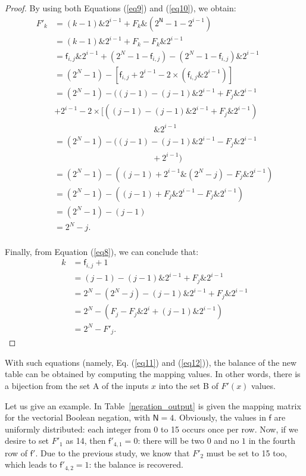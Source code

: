 \documentclass[conference]{IEEEtran}
\begin{document}
\begin{proof}
By using both Equations (\ref{eq9}) and (\ref{eq10}), we obtain:
\begin{equation}
\label{eq11}
\begin{array}{ll}
F'_k&=(k-1)\&2^{i-1}+F_k\&(2^\mathsf{N}-1-2^{i-1})\\
&=(k-1)\&2^{i-1}+F_k-F_k\&2^{i-1}\\
&=\mathsf{f}_{i,j} \& 2^{i-1}+(2^N-1-\mathsf{f}_{i,j})-(2^N-1-\mathsf{f}_{i,j}) \& 2^{i-1}\\
&=(2^N-1)-[\mathsf{f}_{i,j}+2^{i-1}-2 \times (\mathsf{f}_{i,j} \& 2^{i-1})] \\
&=(2^N-1)-((j-1)-(j-1)\&2^{i-1}+F_j\&2^{i-1}\\
&+2^{i-1}-2 \times [((j-1)-(j-1) \& 2^{i-1}+F_j \& 2^{i-1})\\
&~~~~~~~~~~~~~~~~~~~~~~~~~~~~~~~~~~~~~~~~~~~~~~~~~~~~~~\& 2^{i-1}\\
&=(2^N-1)-((j-1)-(j-1)\&2^{i-1}-F_j\&2^{i-1}\\
&~~~~~~~~~~~~~~~~~~~~~~~~~~~~~~~~~~~~~~~~~~~~~~~~~~~~~+2^{i-1})\\
&=(2^N-1)-((j-1)+2^{i-1}\&(2^N-j)-F_j\&2^{i-1})\\
&=(2^N-1)-((j-1)+F_j\&2^{i-1}-F_j\&2^{i-1})\\
&=(2^N-1)-(j-1)\\
&=2^N-j.\\
\end{array}
\end{equation}


Finally, from Equation (\ref{eq8}), we can conclude that:
\begin{equation}
\label{eq12}
\begin{array}{ll}
k&=\mathsf{f}_{i,j}+1\\
&=(j-1)-(j-1)\&2^{i-1}+F_j\&2^{i-1} \\
&=2^N-(2^N-j)-(j-1)\&2^{i-1}+F_j\&2^{i-1}\\
&=2^N-(F_j-F_j\&2^i+(j-1)\&2^{i-1})  \\
&=2^N-F'_j.
\end{array}
\end{equation}
\end{proof}

With such equations (namely, Eq. (\ref{eq11}) and (\ref{eq12})), the balance of the new table can be obtained by computing the mapping values. In other words, there is a bijection from the set A of the inputs $x$ into the set B of $F'(x)$ values.

Let us give an example. In Table~\ref{negation_output} is given the mapping matrix for the vectorial Boolean negation, with $\mathsf{N}=4$. Obviously, the values in $\mathsf{f}$ are uniformly distributed: each integer from 0 to 15 occurs once per row. 
Now, if we desire to set $F'_1$ as 14, then $\mathsf{f}'_{4,1}=0$: there will be two $0$ and no $1$ in the fourth row of $\mathsf{f}'$. Due to the previous study, we know that $F'_2$ must be set to 15 too, which leads to $\mathsf{f}'_{4,2}=1$: the balance is recovered.
\end{document}
